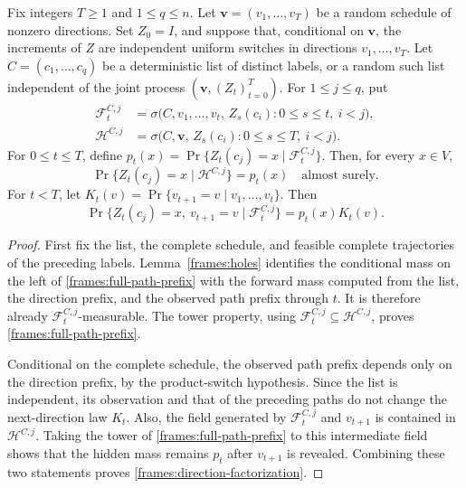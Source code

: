 \begin{corollary}
\label{frames:conditional-interface}
Fix integers $T\ge1$ and $1\le q\le n$. Let
$\mathbf v=(v_1,\ldots,v_T)$ be a random schedule of nonzero directions.
Set $Z_0=I$, and suppose that, conditional on $\mathbf v$, the
increments of $Z$ are independent uniform switches in directions
$v_1,\ldots,v_T$. Let $C=(c_1,\ldots,c_q)$ be a deterministic list of
distinct labels, or a random such list independent of the joint process
$(\mathbf v,(Z_t)_{t=0}^T)$. For $1\le j\le q$, put
\begin{align}
 \mathcal F_t^{C,j}
 &=\sigma\bigl(C,v_1,\ldots,v_t,\,
       Z_s(c_i):0\le s\le t,\ i<j\bigr), \label{frames:online-field}\\
 \mathcal H^{C,j}
 &=\sigma\bigl(C,\mathbf v,\,
       Z_s(c_i):0\le s\le T,\ i<j\bigr). \label{frames:terminal-field}
\end{align}
For $0\le t\le T$, define
$p_t(x)=\Pr\{Z_t(c_j)=x\mid\mathcal F_t^{C,j}\}$.
Then, for every $x\in V$,
\begin{equation}
 \Pr\{Z_t(c_j)=x\mid\mathcal H^{C,j}\}=p_t(x)
 \quad\text{almost surely}. \label{frames:full-path-prefix}
\end{equation}
For $t<T$, let
$K_t(v)=\Pr\{v_{t+1}=v\mid v_1,\ldots,v_t\}$. Then
\begin{equation}
 \Pr\{Z_t(c_j)=x,\ v_{t+1}=v\mid\mathcal F_t^{C,j}\}
 =p_t(x)K_t(v). \label{frames:direction-factorization}
\end{equation}
\end{corollary}

\begin{proof}
First fix the list, the complete schedule, and feasible complete
trajectories of the preceding labels. Lemma~\ref{frames:holes} identifies
the conditional mass on the left of \eqref{frames:full-path-prefix} with
the forward mass computed from the list, the direction prefix, and the
observed path prefix through $t$. It is therefore already
$\mathcal F_t^{C,j}$-measurable. The tower property, using
$\mathcal F_t^{C,j}\subseteq\mathcal H^{C,j}$, proves
\eqref{frames:full-path-prefix}.

Conditional on the complete schedule, the observed path prefix depends
only on the direction prefix, by the product-switch hypothesis. Since
the list is independent, its observation and that of the preceding
paths do not change the next-direction law $K_t$. Also, the field
generated by $\mathcal F_t^{C,j}$ and $v_{t+1}$ is contained in
$\mathcal H^{C,j}$. Taking the tower of
\eqref{frames:full-path-prefix} to this intermediate field shows that
the hidden mass remains $p_t$ after $v_{t+1}$ is revealed. Combining
these two statements proves \eqref{frames:direction-factorization}.
\end{proof}

